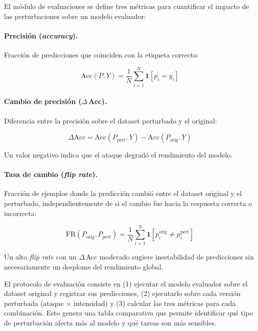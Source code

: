 \documentclass[11pt]{article}
\begin{document}
El módulo de evaluaciones se define tres métricas para cuantificar
el impacto de las perturbaciones sobre un modelo evaluador:

\paragraph{Precisión (\textit{accuracy}).}
Fracción de predicciones que coinciden con la etiqueta correcta:

\begin{equation}
  \text{Acc}(P, Y) = \frac{1}{N} \sum_{i=1}^{N} \mathbf{1}[p_i = y_i]
\end{equation}

\paragraph{Cambio de precisión ($\Delta$\,Acc).}
Diferencia entre la precisión sobre el dataset perturbado y el original:

\begin{equation}
  \Delta\text{Acc} = \text{Acc}(P_\text{pert}, Y) - \text{Acc}(P_\text{orig}, Y)
\end{equation}

Un valor negativo indica que el ataque degradó el rendimiento del modelo.

\paragraph{Tasa de cambio (\textit{flip rate}).}
Fracción de ejemplos donde la predicción cambió entre el dataset original y el
perturbado, independientemente de si el cambio fue hacia la respuesta correcta
o incorrecta:

\begin{equation}
  \text{FR}(P_\text{orig}, P_\text{pert}) = \frac{1}{N}
    \sum_{i=1}^{N} \mathbf{1}[p^\text{orig}_i \neq p^\text{pert}_i]
\end{equation}

Un alto \textit{flip rate} con un $\Delta$\,Acc moderado sugiere inestabilidad de
predicciones sin necesariamente un desplome del rendimiento global.

El protocolo de evaluación consiste en (1) ejecutar el modelo evaluador sobre el
dataset original y registrar sus predicciones, (2) ejecutarlo sobre cada versión
perturbada (ataque $\times$ intensidad) y (3) calcular las tres métricas para
cada combinación. Esto genera una tabla comparativa que permite identificar qué
tipo de perturbación afecta más al modelo y qué tareas son más sensibles.
\end{document}
